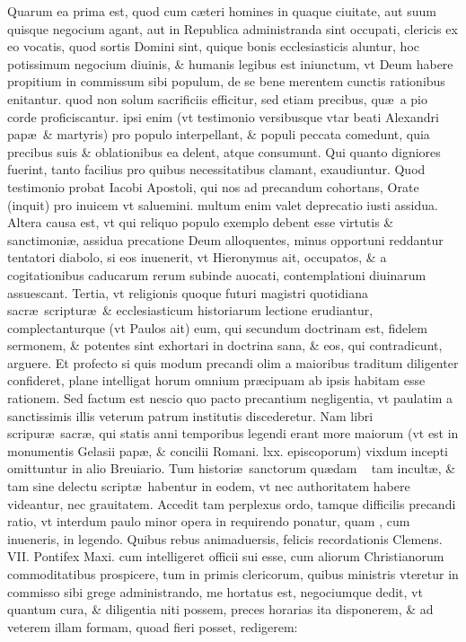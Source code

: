 \documentclass[a5paper,10pt]{book}
\def\ae{æ}
\begin{document}
Quarum ea prima est, quod cum c\ae teri homines in quaque ciuitate, aut suum quisque negocium agant, aut in Republica administranda sint occupati, clericis ex eo vocatis, quod sortis Domini sint, quique bonis ecclesiasticis aluntur, hoc potissimum negocium diuinis, \& humanis legibus est iniunctum, vt Deum habere propitium in commissum sibi populum, de se bene merentem cunctis rationibus enitantur.
quod %
non solum sacrificiis efficitur, sed etiam precibus, qu\ae \ a pio corde proficiscantur.
ipsi %
enim (vt testimonio versibusque vtar beati Alexandri pap\ae \ \& martyris) pro populo interpellant, \& populi peccata comedunt, quia precibus suis \& oblationibus ea delent, atque consumunt.
Qui quanto digniores fuerint, tanto facilius pro quibus necessitatibus clamant, exaudiuntur.
Quod testimonio probat Iacobi Apostoli, qui nos ad precandum cohortans, Orate (inquit) pro inuicem vt saluemini.
multum %
enim valet deprecatio iusti assidua.
Altera causa est, vt qui reliquo populo exemplo debent esse virtutis \& sanctimoni\ae , assidua precatione Deum alloquentes, minus opportuni reddantur tentatori diabolo, si eos inuenerit, vt Hieronymus ait, occupatos, \& a cogitationibus caducarum rerum subinde auocati, contemplationi diuinarum assuescant.
Tertia, vt religionis quoque futuri magistri quotidiana sacr\ae \ scriptur\ae \ \& ecclesiasticum historiarum lectione erudiantur, complectanturque (vt Paulos ait) eum, qui secundum doctrinam est, fidelem 
\fancyhead[C]{\color{red} Pr\ae fatio}
sermonem, \& potentes sint exhortari in doctrina sana, \& eos, qui contradicunt, arguere.
Et profecto si quis modum precandi olim a maioribus traditum diligenter confideret, plane intelligat horum omnium pr\ae cipuam ab ipsis habitam esse rationem.
Sed factum est nescio quo pacto precantium negligentia, vt paulatim a sanctissimis illis veterum patrum institutis discederetur.
Nam libri scripur\ae \ sacr\ae, qui statis anni temporibus legendi erant more maiorum (vt est in monumentis Gelasii pap\ae, \& concilii Romani. lxx. episcoporum) vixdum incepti omittuntur in alio Breuiario.
Tum histori\ae \ sanctorum qu\ae dam \ %
tam incult\ae , \& tam sine delectu script\ae \ habentur in eodem, vt nec authoritatem habere videantur, nec grauitatem.
Accedit tam perplexus ordo, tamque difficilis precandi ratio, vt interdum paulo minor opera in requirendo ponatur, quam%
, cum inueneris, in legendo.
Quibus rebus animaduersis, felicis recordationis Clemens. VII. Pontifex Maxi. cum intelligeret officii sui esse, cum aliorum Christianorum commoditatibus prospicere, tum in primis clericorum, quibus ministris vteretur in commisso sibi grege administrando, me hortatus est, negociumque dedit, vt quantum cura, \& diligentia niti possem, preces horarias ita disponerem, \& ad veterem illam formam, quoad fieri posset, redigerem:
\end{document}
